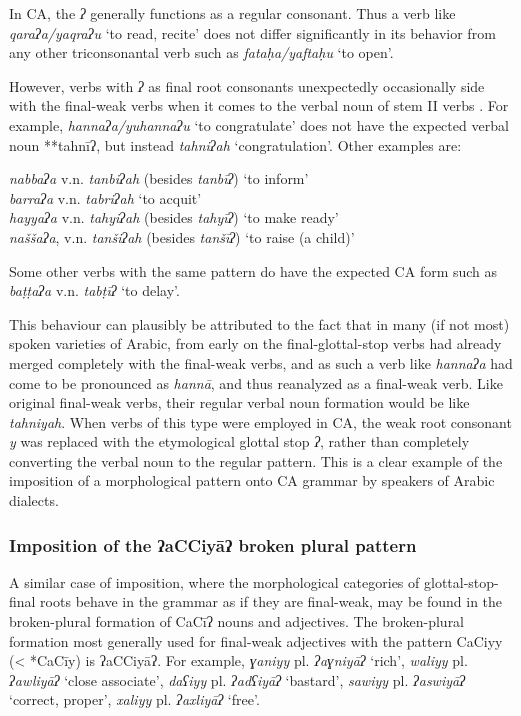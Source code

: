 \documentclass[output=paper]{langsci/langscibook}
\begin{document}
In CA, the \textit{ʔ} generally functions as a regular consonant. Thus a verb like \textit{qaraʔa/yaqraʔu} ‘to read, recite’ does not differ significantly in its behavior from any other triconsonantal verb such as \textit{fataḥa/yaftaḥu} ‘to open’. 

However, verbs with \textit{ʔ} as final root consonants unexpectedly occasionally side with the final-weak verbs when it comes to the verbal noun of stem II verbs \citep[128]{Fischer2002}. For example, \textit{hannaʔa/yuhannaʔu} ‘to congratulate’ does not have the expected verbal noun **tahnīʔ, but instead \textit{tahniʔah} ‘congratulation’. Other examples are:

\ea
\ea\textit{nabbaʔa} v.n. \textit{tanbiʔah} (besides \textit{tanbīʔ}) ‘to inform’\\
\ex\textit{barraʔa} v.n. \textit{tabriʔah} ‘to acquit’\\
\ex\textit{hayyaʔa} v.n. \textit{tahyiʔah} (besides \textit{tahyīʔ}) ‘to make ready’\\
\ex\textit{naššaʔa}, v.n. \textit{tanšiʔah} (besides \textit{tanšīʔ}) ‘to raise (a child)’
\z
\z

Some other verbs with the same pattern do have the expected CA form such as \textit{baṭṭaʔa} v.n. \textit{tabṭīʔ} ‘to delay’.

This behaviour can plausibly be attributed to the fact that in many (if not most) spoken varieties of Arabic, from early on the final-glottal-stop verbs had already merged completely with the final-weak verbs, and as such a verb like \textit{hannaʔa} had come to be pronounced as \textit{hannā}, and thus reanalyzed as a final-weak verb. Like original final-weak verbs, their regular verbal noun formation would be like \textit{tahniyah}. When verbs of this type were employed in CA, the weak root consonant \textit{y} was replaced with the etymological glottal stop \textit{ʔ}, rather than completely converting the verbal noun to the regular pattern. This is a clear example of the imposition of a morphological pattern onto CA grammar by speakers of Arabic dialects.

\subsubsection{\label{bkm:Ref13224796}Imposition of the ʔaCCiyāʔ broken plural pattern}

A similar case of imposition, where the morphological categories of glottal-stop-final roots behave in the grammar as if they are final-weak, may be found in the broken-plural formation of CaCīʔ nouns and adjectives. The broken-plural formation most generally used for final-weak adjectives with the pattern CaCiyy (< *CaCīy) is ʔaCCiyāʔ. For example, \textit{ɣaniyy} pl. \textit{ʔaɣniyāʔ} ‘rich’, \textit{waliyy} pl. \textit{ʔawliyāʔ} ‘close associate’, \textit{daʕiyy} pl. \textit{ʔadʕiyāʔ} ‘bastard’, \textit{sawiyy} pl. \textit{ʔaswiyāʔ} ‘correct, proper’, \textit{xaliyy} pl. \textit{ʔaxliyāʔ} ‘free’.
\end{document}

